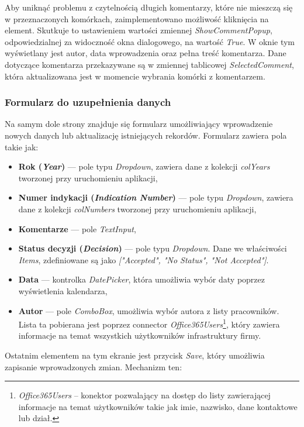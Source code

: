 Aby uniknąć problemu z czytelnością długich komentarzy, które nie mieszczą się w przeznaczonych komórkach, zaimplementowano możliwość kliknięcia na element. Skutkuje to ustawieniem wartości zmiennej \emph{ShowCommentPopup}, odpowiedzialnej za widoczność okna dialogowego, na wartość \emph{True}. W oknie tym wyświetlany jest autor, data wprowadzenia oraz pełna treść komentarza. Dane dotyczące komentarza przekazywane są w zmiennej tablicowej \emph{SelectedComment}, która aktualizowana jest w momencie wybrania komórki z komentarzem.

\subsubsection*{Formularz do uzupełnienia danych}

Na samym dole strony znajduje się formularz umożliwiający wprowadzenie nowych danych lub aktualizację istniejących rekordów. Formularz zawiera pola takie jak:
\begin{itemize}
    \item \textbf{Rok (\emph{Year})} — pole typu \emph{Dropdown}, zawiera dane z kolekcji \emph{colYears} tworzonej przy uruchomieniu aplikacji,
    \item \textbf{Numer indykacji (\emph{Indication Number})} — pole typu \emph{Dropdown}, zawiera dane z kolekcji \emph{colNumbers} tworzonej przy uruchomieniu aplikacji,
    \item \textbf{Komentarze} — pole \emph{TextInput},
    \item \textbf{Status decyzji (\emph{Decision})} — pole typu \emph{Dropdown}. Dane we właściwości \emph{Items}, zdefiniowane są jako \emph{["Accepted", "No Status", "Not Accepted"]}.
    \item \textbf{Data} — kontrolka \emph{DatePicker}, która umożliwia wybór daty poprzez wyświetlenia kalendarza,
    \item \textbf{Autor} — pole \emph{ComboBox}, umożliwia wybór autora z listy pracowników. Lista ta pobierana jest poprzez connector \emph{Office365Users}\footnote{\emph{Office365Users} -- konektor pozwalający na dostęp do listy zawierającej informacje na temat użytkowników takie jak imie, nazwisko, dane kontaktowe lub dział.}, który zawiera informacje na temat wszystkich użytkowników infrastruktury firmy.
\end{itemize}





Ostatnim elementem na tym ekranie jest przycisk \emph{Save}, który umożliwia zapisanie wprowadzonych zmian. Mechanizm ten:

